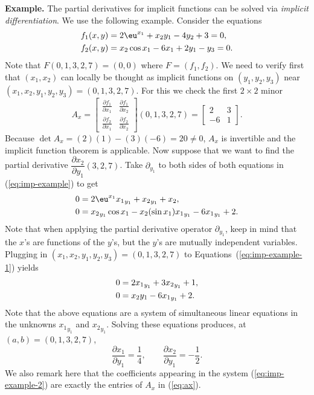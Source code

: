 \documentclass[11pt]{article}
\begin{document}
\noindent\textbf{Example.} The partial derivatives for implicit functions can be solved via \textit{implicit differentiation}.  We use the following example.
Consider the equations
\begin{align}
  f_1(x,y) &= 2 \eu^{x_1} + x_2 y_1 - 4 y_2 + 3 = 0, \notag \\
  \label{eq:imp-example}
  f_2(x,y) &= x_2 \cos x_1 - 6 x_1 + 2 y_1 - y_3 = 0. 
\end{align}
Note that $F(0,1,3,2,7) = (0,0)$ where $F = (f_1, f_2)$.
We need to verify first that $(x_1, x_2)$ can locally be thought as implicit functions on $(y_1,y_2,y_3)$ near $(x_1,x_2,y_1,y_2,y_3) = (0,1,3,2,7)$.
For this we check the first $2 \times 2$ minor
\begin{equation}
  \label{eq:ax}
  A_x = \begin{bmatrix}
    \frac{\partial f_1}{\partial x_1} & \frac{\partial f_1}{\partial x_2} \\[5pt]
    \frac{\partial f_2}{\partial x_1} & \frac{\partial f_2}{\partial x_2}
  \end{bmatrix} (0,1,3,2,7) =
  \begin{bmatrix}
    2 & 3 \\ -6 & 1
  \end{bmatrix}.
\end{equation}
Because $\det A_x = (2)(1) - (3)(-6) = 20 \ne 0$, $A_x$ is invertible and the implicit function theorem is applicable.
Now suppose that we want to find the partial derivative $\dfrac{\partial x_2}{\partial y_1} (3,2,7)$.
Take $\partial_{y_1}$ to both sides of both equations in (\ref{eq:imp-example}) to get
\begin{align}
  0 &= 2 \eu^{x_1} {x_1}_{y_1} + {x_2}_{y_1} + x_2, \notag \\
  \label{eq:imp-example-1}
  0 &= {x_2}_{y_1} \cos x_1 - x_2 (\sin x_1) {x_1}_{y_1} - 6 {x_1}_{y_1} + 2.
\end{align}
Note that when applying the partial derivative operator $\partial_{y_1}$, keep in mind that the $x$'s are functions of the $y$'s, but the $y$'s are mutually independent variables.  Plugging in $(x_1,x_2,y_1,y_2,y_3) = (0,1,3,2,7)$ to Equations~(\ref{eq:imp-example-1}) yields
\begin{align}
  0 &= 2 {x_1}_{y_1} + 3 {x_2}_{y_1} + 1,\notag \\ \label{eq:imp-example-2}
  0 &= {x_2}{y_1} - 6 {x_1}_{y_1} + 2.
\end{align}
Note that the above equations are a system of simultaneous linear equations in the unknowns ${x_1}_{y_1}$ and ${x_2}_{y_1}$.
Solving these equations produces, at $(a,b) = (0,1,3,2,7)$,
\[
  \frac{\partial x_1}{\partial y_1} = \frac14, \qquad
  \frac{\partial x_2}{\partial y_1} = - \frac12.
\]
We also remark here that the coefficients appearing in the system (\ref{eq:imp-example-2}) are exactly the entries of $A_x$ in (\ref{eq:ax}).
\end{document}
